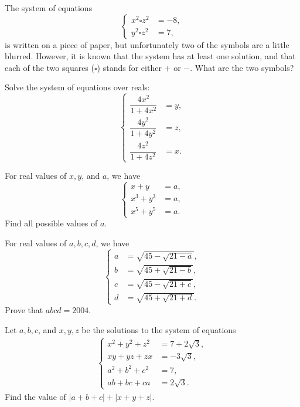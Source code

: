 \documentclass[12pt,a4paper]{memoir}
\theoremstyle{definition}
\begin{document}
\begin{question}[name={2017 Denmark (Georg Mohr)}]
	The system of equations
	\[\begin{cases}
		x^2 \square z^2 &= -8,\\ y^2 \square z^2 &= 7,
	\end{cases}\]
	is written on a piece of paper, but unfortunately two of the symbols are a little blurred. However, it is known that the system has at least one solution, and that each of the two squares ($\square$) stands for either $+$ or $-$. What are the two symbols?
\end{question}

\begin{question}[name={1999 Switzerland TST}]
	Solve the system of equations over reals:
	\[\begin{cases}
		\dfrac{4x^2}{1+4x^2} &= y, \\ \dfrac{4y^2}{1+4y^2} &= z,\\ \dfrac{4z^2}{1+4z^2} &= x.
	\end{cases}\]
\end{question}


\begin{question}[name={2003 Switzerland TST}]
	For real values of $x,y$, and $a$, we have
	\[\begin{cases}
		x + y  &= a, \\ x^3 + y^3  &= a,\\ x^5 + y^5  &= a.
	\end{cases}\]
	Find all possible values of $a$.
\end{question}



\begin{question}[name={2004 Switzerland TST}]
	For real values of $a,b,c,d$, we have
	\[\begin{cases}
		a  &= \sqrt{45-\sqrt{21-a}}, \\ b  &= \sqrt{45+\sqrt{21-b}},\\ c  &= \sqrt{45-\sqrt{21+c}},\\ d  &= \sqrt{45+\sqrt{21+d}}.
	\end{cases}\]
	Prove that $abcd=2004$.
\end{question}


\begin{question}[name={2007 Ecuador TST}]
	Let $a,b,c$, and $x,y,z$ be the solutions to the system of equations
	\begin{align*}
		\begin{cases}
			x^2+y^2+z^2 &= 7+2\sqrt{3},\\
			xy+yz+zx &= -3\sqrt{3},\\
			a^2+b^2+c^2 &= 7,\\
			ab+bc+ca &= 2\sqrt{3}.
		\end{cases}
	\end{align*}
	Find the value of $|a+b+c|+|x+y+z|$.
\end{question}
\end{document}

